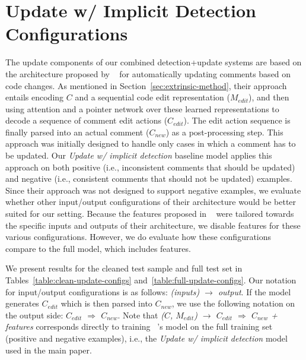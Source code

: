 \documentclass[letterpaper]{article} %
\newcommand{\Comment}{$C$}
\newcommand{\NewComment}{$C_{new}$}
\newcommand{\EditComment}{$C_{edit}$}
\newcommand{\EditCode}{$M_{edit}$}
\newcommand{\UpdateCopy}{Update w/ implicit detection}
\begin{document}
\section{Update w/ Implicit Detection Configurations}
 
 

 The update components of our combined detection+update systems are based on the architecture proposed by ~\citet{panthaplackel2020update} for automatically updating comments based on code changes. As mentioned in Section~\ref{sec:extrinsic-method}, their approach entails encoding \Comment{} and a sequential code edit representation (\EditCode{}), and then using attention and a pointer network over these learned representations to decode a sequence of comment edit actions (\EditComment{}). The edit action sequence is finally parsed into an actual comment (\NewComment{}) as a post-processing step. This approach was initially designed to handle only cases in which a comment has to be updated. Our \textit{\UpdateCopy{}} baseline model applies this approach on both positive (i.e., inconsistent comments that should be updated) and negative (i.e., consistent comments that should not be updated) examples. Since their approach was not designed to support negative examples, we evaluate whether other input/output configurations of their architecture would be better suited for our setting. Because the features proposed in ~\citet{panthaplackel2020update} were tailored towards the specific inputs and outputs of their architecture, we disable features for these various configurations. However, we do evaluate how these configurations compare to the full model, which includes features.
 
 We present results for the cleaned test sample and full test set in Tables~\ref{table:clean-update-configs} and~\ref{table:full-update-configs}. Our notation for input/output configurations is as follows: \textit{(inputs) $\rightarrow$ output}. If the model generates \EditComment{} which is then parsed into \NewComment{}, we use the following notation on the output side: \textit{\EditComment{} $\Rightarrow$ \NewComment{}}. Note that \textit{(\Comment{}, \EditCode{}) $\rightarrow$ \EditComment{}  $\Rightarrow$ \NewComment{} + features} corresponds directly to training ~\citet{panthaplackel2020update}'s model on the full training set (positive and negative examples), i.e., the \textit{\UpdateCopy{}} model used in the main paper.
 
\end{document}
